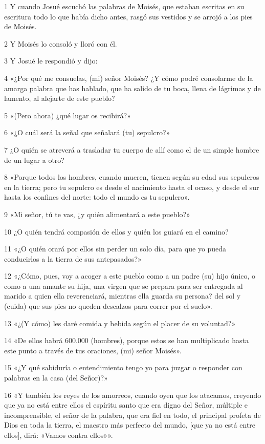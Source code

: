 \par 1 Y cuando Josué escuchó las palabras de Moisés, que estaban escritas en su escritura todo lo que había dicho antes, rasgó sus vestidos y se arrojó a los pies de Moisés.
\par 2 Y Moisés lo consoló y lloró con él.
\par 3 Y Josué le respondió y dijo:
\par 4 «¿Por qué me consuelas, (mi) señor Moisés? ¿Y cómo podré consolarme de la amarga palabra que has hablado, que ha salido de tu boca, llena de lágrimas y de lamento, al alejarte de este pueblo?
\par 5 «(Pero ahora) ¿qué lugar os recibirá?»
\par 6 «¿O cuál será la señal que señalará (tu) sepulcro?»
\par 7 ¿O quién se atreverá a trasladar tu cuerpo de allí como el de un simple hombre de un lugar a otro?
\par 8 «Porque todos los hombres, cuando mueren, tienen según su edad sus sepulcros en la tierra; pero tu sepulcro es desde el nacimiento hasta el ocaso, y desde el sur hasta los confines del norte: todo el mundo es tu sepulcro».
\par 9 «Mi señor, tú te vas, ¿y quién alimentará a este pueblo?»
\par 10 ¿O quién tendrá compasión de ellos y quién los guiará en el camino?
\par 11 «¿O quién orará por ellos sin perder un solo día, para que yo pueda conducirlos a la tierra de sus antepasados?»
\par 12 «¿Cómo, pues, voy a acoger a este pueblo como a un padre (su) hijo único, o como a una amante su hija, una virgen que se prepara para ser entregada al marido a quien ella reverenciará, mientras ella guarda su persona? del sol y (cuida) que sus pies no queden descalzos para correr por el suelo».
\par 13 «¿(Y cómo) les daré comida y bebida según el placer de su voluntad?»
\par 14 «De ellos habrá 600.000 (hombres), porque estos se han multiplicado hasta este punto a través de tus oraciones, (mi) señor Moisés».
\par 15 «¿Y qué sabiduría o entendimiento tengo yo para juzgar o responder con palabras en la casa (del Señor)?»
\par 16 «Y también los reyes de los amorreos, cuando oyen que los atacamos, creyendo que ya no está entre ellos el espíritu santo que era digno del Señor, múltiple e incomprensible, el señor de la palabra, que era fiel en todo, el principal profeta de Dios en toda la tierra, el maestro más perfecto del mundo, [que ya no está entre ellos], dirá: «Vamos contra ellos»».
